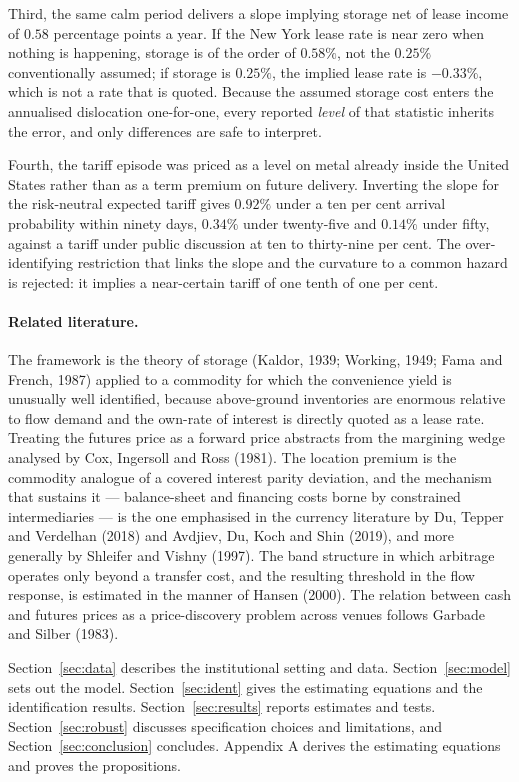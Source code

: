 \documentclass[11pt,a4paper]{article}
\newcounter{proposition}
\begin{document}
Third, the same calm period delivers a slope implying storage net of lease
income of $0.58$ percentage points a year. If the New York lease rate is near
zero when nothing is happening, storage is of the order of $0.58\%$, not the
$0.25\%$ conventionally assumed; if storage is $0.25\%$, the implied lease rate
is $-0.33\%$, which is not a rate that is quoted. Because the assumed storage
cost enters the annualised dislocation one-for-one, every reported
\emph{level} of that statistic inherits the error, and only differences are
safe to interpret.

Fourth, the tariff episode was priced as a level on metal already inside the
United States rather than as a term premium on future delivery. Inverting the
slope for the risk-neutral expected tariff gives $0.92\%$ under a ten per cent
arrival probability within ninety days, $0.34\%$ under twenty-five and $0.14\%$
under fifty, against a tariff under public discussion at ten to thirty-nine per
cent. The over-identifying restriction that links the slope and the curvature
to a common hazard is rejected: it implies a near-certain tariff of one tenth
of one per cent.

\paragraph{Related literature.}
The framework is the theory of storage (Kaldor, 1939; Working, 1949; Fama and
French, 1987) applied to a commodity for which the convenience yield is
unusually well identified, because above-ground inventories are enormous
relative to flow demand and the own-rate of interest is directly quoted as a
lease rate. Treating the futures price as a forward price abstracts from the
margining wedge analysed by Cox, Ingersoll and Ross (1981). The location
premium is the commodity analogue of a covered interest parity deviation, and
the mechanism that sustains it --- balance-sheet and financing costs borne by
constrained intermediaries --- is the one emphasised in the currency literature
by Du, Tepper and Verdelhan (2018) and Avdjiev, Du, Koch and Shin (2019), and
more generally by Shleifer and Vishny (1997). The band structure in which
arbitrage operates only beyond a transfer cost, and the resulting threshold in
the flow response, is estimated in the manner of Hansen (2000). The relation
between cash and futures prices as a price-discovery problem across venues
follows Garbade and Silber (1983).

Section~\ref{sec:data} describes the institutional setting and data.
Section~\ref{sec:model} sets out the model. Section~\ref{sec:ident} gives the
estimating equations and the identification results. Section~\ref{sec:results}
reports estimates and tests. Section~\ref{sec:robust} discusses specification
choices and limitations, and Section~\ref{sec:conclusion} concludes. Appendix
A derives the estimating equations and proves the propositions.
\end{document}
